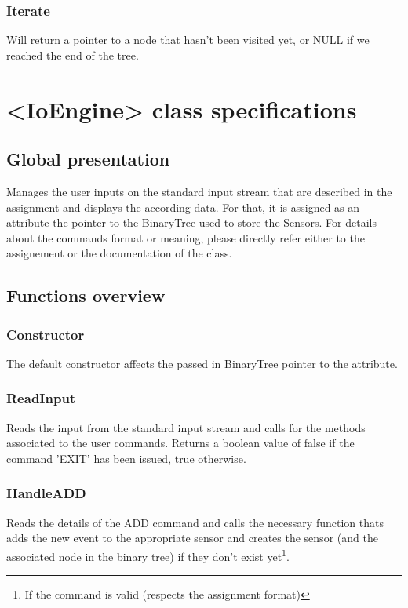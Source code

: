 \documentclass[10pt]{article}
\begin{document}
\subsubsection*{Iterate}
Will return a pointer to a node that hasn't been visited yet, or NULL if we reached the end of the tree.
 
\section{<IoEngine> class specifications}
\subsection{Global presentation}
Manages the user inputs on the standard input stream that are described in the assignment and displays the according data. For that, it is assigned as an attribute the pointer to the BinaryTree used to store the Sensors. For details about the commands format or meaning, please directly refer either to the assignement or the documentation of the class.

\subsection{Functions overview}

\subsubsection*{Constructor}
The default constructor affects the passed in BinaryTree pointer to the attribute.

\subsubsection*{ReadInput}
Reads the input from the standard input stream and calls for the methods associated to the user commands. Returns a boolean value of false if the command 'EXIT' has been issued, true otherwise.

\subsubsection*{HandleADD}
Reads the details of the ADD command and calls the necessary function thats adds the new event to the appropriate sensor and creates the sensor (and the associated node in the binary tree) if they don't exist yet\footnote{ If the command is valid (respects the assignment format)}.
\end{document}
